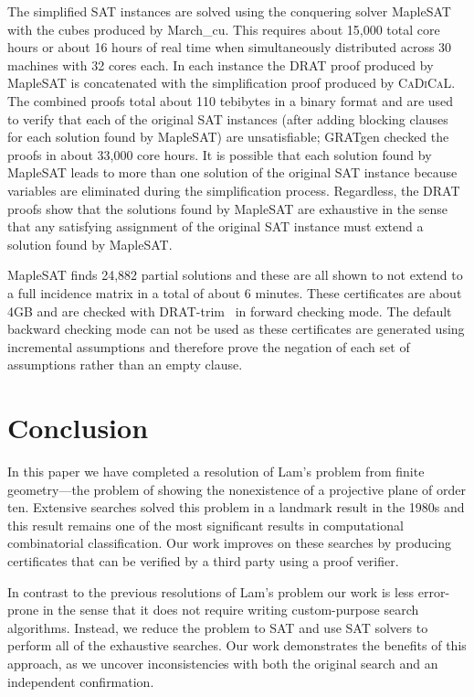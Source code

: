 \documentclass[letterpaper]{article}
\begin{document}
The simplified SAT instances are solved using the
conquering solver MapleSAT with the cubes produced by March\_cu.
This requires about 15,000 total core hours or about 16 hours of
real time when simultaneously distributed across 30 machines with 32 cores each.
In each instance the DRAT proof produced by MapleSAT is concatenated
with the simplification proof produced by \textsc{CaDiCaL}.
The combined proofs total about 110 tebibytes in a binary format and are used to verify
that each of the original SAT instances (after adding blocking
clauses for each solution found by MapleSAT) are unsatisfiable;
GRATgen checked the proofs in about 33,000 core hours.
It is possible that each solution found by MapleSAT leads to more than
one solution of the original SAT instance because
variables are eliminated during the simplification process.
Regardless, the DRAT proofs show that the solutions found by MapleSAT
are exhaustive in the sense that any satisfying assignment of the original SAT instance
must extend a solution found by MapleSAT.

MapleSAT finds 24,882 partial solutions and
these are all shown to not extend to a full incidence matrix
in a total of about 6 minutes.  These certificates are about 4GB and are
checked with DRAT-trim~\cite{wetzler2014drat}
in forward checking mode.  The default backward
checking mode can not be used as these certificates
are generated using incremental assumptions and therefore
prove the negation of each set of assumptions rather than an empty clause.

\section{Conclusion}

In this paper we have completed a resolution of Lam's problem
from finite geometry---the problem of showing the nonexistence
of a projective plane of order ten.  Extensive searches
solved this problem in a landmark result in the 1980s and
this result remains one of the most significant results in computational
combinatorial classification.
Our work improves on these searches by producing certificates
that can be verified by a third party using a proof verifier.

In contrast to the previous resolutions of Lam's problem our
work is less error-prone in the sense that it does not require
writing custom-purpose search algorithms.  Instead, we
reduce the problem to SAT and use SAT solvers to perform all
of the exhaustive searches.  Our work demonstrates
the benefits of this approach, as we uncover inconsistencies
with both the original search and an independent confirmation.
\end{document}
